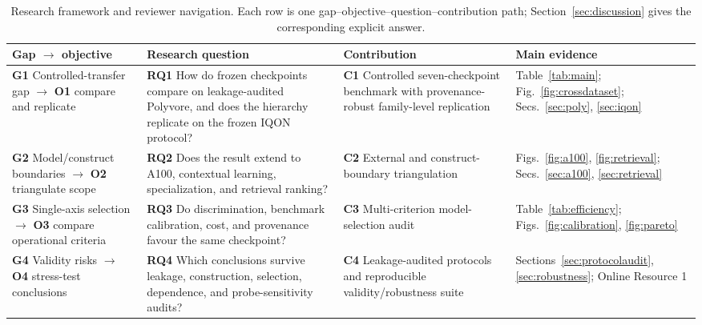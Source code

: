 \begin{table}[t]
\caption{Research framework and reviewer navigation. Each row is one gap--objective--question--contribution path; Section~\ref{sec:discussion} gives the corresponding explicit answer.}
\label{tab:framework}
\centering\small{}
\setlength{\tabcolsep}{4pt}\renewcommand{\arraystretch}{1.12}
\begin{tabularx}{\textwidth}{@{}>{\raggedright\arraybackslash}p{}>{\raggedright\arraybackslash}p{}>{\raggedright\arraybackslash}p{}>{\raggedright\arraybackslash}X@{}}
\toprule
Gap $\rightarrow$ objective & Research question & Contribution & Main evidence \\
\midrule
\textbf{G1} Controlled-transfer gap $\rightarrow$ \textbf{O1} compare and replicate & \textbf{RQ1} How do frozen checkpoints compare on leakage-audited Polyvore, and does the hierarchy replicate on the frozen IQON protocol? & \textbf{C1} Controlled seven-checkpoint benchmark with provenance-robust family-level replication & Table~\ref{tab:main}; Fig.~\ref{fig:crossdataset}; Secs.~\ref{sec:poly}, \ref{sec:iqon} \\
\textbf{G2} Model/construct boundaries $\rightarrow$ \textbf{O2} triangulate scope & \textbf{RQ2} Does the result extend to A100, contextual learning, specialization, and retrieval ranking? & \textbf{C2} External and construct-boundary triangulation & Figs.~\ref{fig:a100}, \ref{fig:retrieval}; Secs.~\ref{sec:a100}, \ref{sec:retrieval} \\
\textbf{G3} Single-axis selection $\rightarrow$ \textbf{O3} compare operational criteria & \textbf{RQ3} Do discrimination, benchmark calibration, cost, and provenance favour the same checkpoint? & \textbf{C3} Multi-criterion model-selection audit & Table~\ref{tab:efficiency}; Figs.~\ref{fig:calibration}, \ref{fig:pareto} \\
\textbf{G4} Validity risks $\rightarrow$ \textbf{O4} stress-test conclusions & \textbf{RQ4} Which conclusions survive leakage, construction, selection, dependence, and probe-sensitivity audits? & \textbf{C4} Leakage-audited protocols and reproducible validity/robustness suite & Sections~\ref{sec:protocolaudit}, \ref{sec:robustness}; Online Resource 1 \\
\bottomrule
\end{tabularx}
\end{table}
